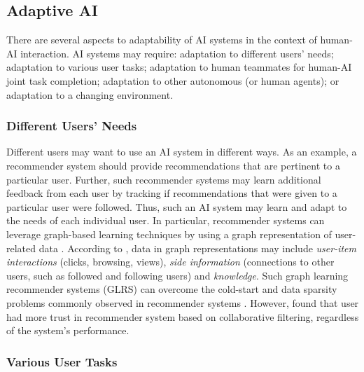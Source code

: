 \subsection{Adaptive AI}

There are several aspects to adaptability of AI systems in the context of human-AI interaction. AI systems may
require: adaptation to different users' needs; adaptation to various user tasks; adaptation to human teammates for human-AI
joint task completion; adaptation to other autonomous (or human agents); or adaptation to a changing environment.

\subsubsection{Different Users' Needs}

Different users may want to use an AI system in different ways. As an example, a recommender system should
provide recommendations that are pertinent to a particular user. Further, such recommender systems may learn
additional feedback from each user by tracking if recommendations that were given to a particular user were
followed. Thus, such an AI system may learn and adapt to the needs of each individual user. 
In particular, recommender systems can leverage graph-based learning techniques by using a graph representation
of user-related data \citep{zhangRecommendingGraphsComprehensive2023}. According to \cite{dengRecommenderSystemsBased2022},
data in graph representations may include \textit{user-item interactions} (clicks, browsing, views), \textit{side information}
(connections to other users, such as followed and following users) and \textit{knowledge}. Such graph learning recommender
systems (GLRS) can overcome the cold-start and data sparsity problems commonly observed in recommender systems
\citep{zhangRecommendingGraphsComprehensive2023}. However, \cite{liaoUserTrustRecommendation2022} found that user had
more trust in recommender system based on collaborative filtering, regardless of the system's performance.

\subsubsection{Various User Tasks}

